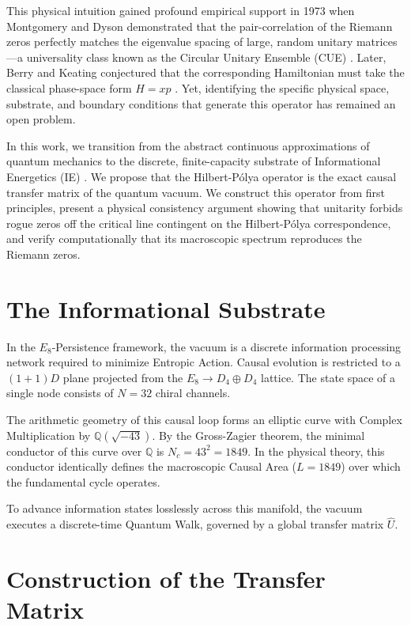 \documentclass[11pt,aps,prd,twocolumn,nofootinbib,superscriptaddress]{revtex4-2}
\begin{document}
This physical intuition gained profound empirical support in 1973 when Montgomery and Dyson demonstrated that the pair-correlation of the Riemann zeros perfectly matches the eigenvalue spacing of large, random unitary matrices—a universality class known as the Circular Unitary Ensemble (CUE) \cite{diamond_pair_1973}. Later, Berry and Keating conjectured that the corresponding Hamiltonian must take the classical phase-space form $H = xp$ \cite{berry_riemann_1999}. Yet, identifying the specific physical space, substrate, and boundary conditions that generate this operator has remained an open problem.

In this work, we transition from the abstract continuous approximations of quantum mechanics to the discrete, finite-capacity substrate of Informational Energetics (IE) \cite{meyer_informational_2026}. We propose that the Hilbert-P\'olya operator is the exact causal transfer matrix of the quantum vacuum. We construct this operator from first principles, present a physical consistency argument showing that unitarity forbids rogue zeros off the critical line contingent on the Hilbert-Pólya correspondence, and verify computationally that its macroscopic spectrum reproduces the Riemann zeros.

\section{The Informational Substrate}

In the $E_8$-Persistence framework, the vacuum is a discrete information processing network required to minimize Entropic Action. Causal evolution is restricted to a $(1+1)D$ plane projected from the $E_8 \to D_4 \oplus D_4$ lattice. The state space of a single node consists of $N=32$ chiral channels. 

The arithmetic geometry of this causal loop forms an elliptic curve with Complex Multiplication by $\mathbb{Q}(\sqrt{-43})$. By the Gross-Zagier theorem, the minimal conductor of this curve over $\mathbb{Q}$ is $N_c = 43^2 = 1849$. In the physical theory, this conductor identically defines the macroscopic Causal Area ($L = 1849$) over which the fundamental cycle operates.

To advance information states losslessly across this manifold, the vacuum executes a discrete-time Quantum Walk, governed by a global transfer matrix $\hat{U}$. 

\section{Construction of the Transfer Matrix}
\end{document}
